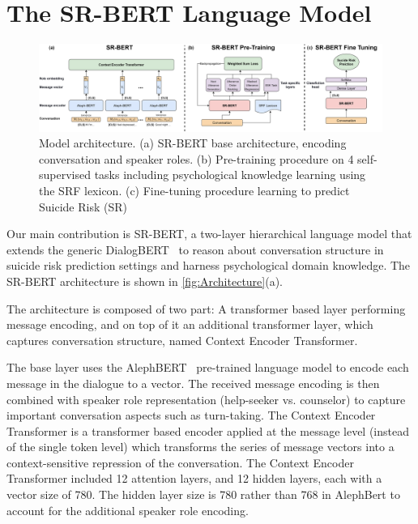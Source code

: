 \documentclass[letterpaper]{article} %
\newcommand{\kibitz}[2]{\ifnum\Comments=1{\textcolor{#1}{#2}}\fi}
\newcommand{\kg}[1]{\kibitz{red}{[KG:#1]}}
\newcommand{\di}[1]{\kibitz{blue}{[DI:#1]}}
\begin{document}
 

\section{The SR-BERT Language Model}

\begin{figure}
\centering
\includegraphics[width=2.2\columnwidth]{figures/ModelArchitecture.png} 
\caption{Model architecture. (a) SR-BERT base architecture, encoding conversation and speaker roles.
(b) Pre-training procedure on 4 self-supervised tasks including psychological knowledge learning using the SRF lexicon.
(c) Fine-tuning procedure learning to predict Suicide Risk (SR)}

\label{fig:Architecture}

\end{figure}

Our main contribution is 
SR-BERT,  a two-layer hierarchical language model that  extends the generic DialogBERT~\cite{gu2021dialogbert} to reason about  conversation structure in suicide risk prediction settings and harness psychological domain knowledge.
The SR-BERT architecture is shown in \autoref{fig:Architecture}(a). 


The architecture is composed of two part: A transformer based layer performing message encoding, and on top of it an additional transformer layer, which captures conversation structure, named  Context Encoder Transformer. 

The base layer uses the AlephBERT~\cite{seker2022alephbert} pre-trained language model to encode each message in the dialogue to a vector. The received message encoding is then combined with speaker role representation (help-seeker vs. counselor) to capture important conversation aspects such as turn-taking. The Context Encoder Transformer is a transformer based encoder applied at the message level (instead of the single token level) which transforms the series of message vectors into a context-sensitive repression of the conversation.  The Context Encoder Transformer included 12 attention layers, and 12 hidden layers, each with a vector size of 780. The hidden layer size is 780 rather than 768 in AlephBert to account for the additional speaker role encoding. 
\end{document}
